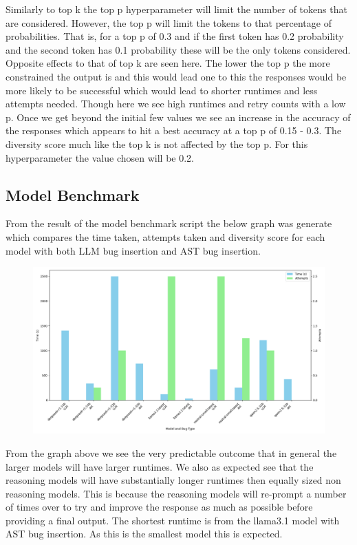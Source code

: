 \documentclass[12pt]{extarticle}
\begin{document}
Similarly to top k the top p hyperparameter will limit the number of tokens that are considered. However, the top p will limit the tokens to that percentage of probabilities. That is, for a top p of 0.3 and if the first token has 0.2 probability and the second token has 0.1 probability these will be the only tokens considered. Opposite effects to that of top k are seen here. The lower the top p the more constrained the output is and this would lead one to this the responses would be more likely to be successful which would lead to shorter runtimes and less attempts needed. Though here we see high runtimes and retry counts with a low p. Once we get beyond the initial few values we see an increase in the accuracy of the responses which appears to hit a best accuracy at a top p of 0.15 - 0.3. The diversity score much like the top k is not affected by the top p. For this hyperparameter the value chosen will be 0.2.


\subsection{Model Benchmark}

From the result of the model benchmark script the below graph was generate which compares the time taken, attempts taken and diversity score for each model with both LLM bug insertion and AST bug insertion.
\begin{figure}[h!]
\centering
\includegraphics[width=\linewidth]{Images/Model_Comparison_Fibbonaci.png}
\label{fig:Model_Benchmark}
\end{figure}

From the graph above we see the very predictable outcome that in general the larger models will have larger runtimes. We also as expected see that the reasoning models will have substantially longer runtimes then equally sized non reasoning models. This is because the reasoning models will re-prompt a number of times over to try and improve the response as much as possible before providing a final output. The shortest runtime is from the llama3.1 model with AST bug insertion. As this is the smallest model this is expected. 
\end{document}
